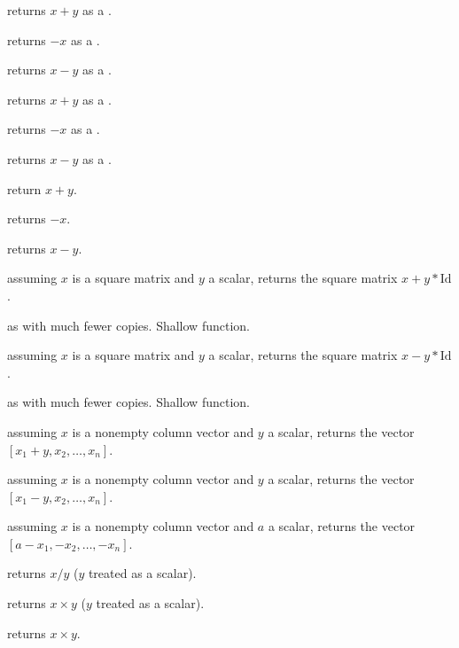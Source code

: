  returns $x + y$ as a .

 returns $-x$ as a .

 returns $x - y$ as a .

 returns $x + y$ as a .

 returns $-x$ as a .

 returns $x - y$ as a .

 return $x+y$.

 returns $-x$.

 returns $x-y$.

 assuming $x$ is a square matrix
and $y$ a scalar, returns the square matrix $x + y*\text{Id}$.

 as  with much
fewer copies. Shallow function.

 assuming $x$ is a square matrix
and $y$ a scalar, returns the square matrix $x - y*\text{Id}$.

 as  with much
fewer copies. Shallow function.

 assuming $x$ is a nonempty column vector
and $y$ a scalar, returns the vector $[x_1 + y, x_2,\dots,x_n]$.

 assuming $x$ is a nonempty column vector
and $y$ a scalar, returns the vector $[x_1 - y, x_2,\dots,x_n]$.

 assuming $x$ is a nonempty column vector
and $a$ a scalar, returns the vector $[a - x_1, -x_2,\dots,-x_n]$.


 returns $x/y$ ($y$ treated as a scalar).



 returns $x\times y$ ($y$ treated as a
scalar).

 returns $x\times y$.

